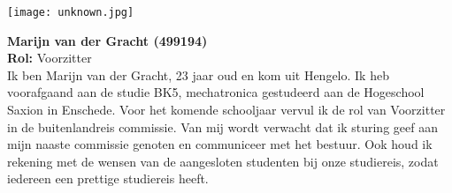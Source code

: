 \vspace{1cm}

\begin{minipage}{0.5\linewidth}
	\texttt{[image: unknown.jpg]}
\end{minipage}
\hfill
\vspace{1cm}
\begin{minipage}{\linewidth}
	\textbf{Marijn van der Gracht (499194)} \\
	\textbf{Rol:} Voorzitter \\
	Ik ben Marijn van der Gracht, 23 jaar oud en kom uit Hengelo. Ik heb voorafgaand aan de studie BK5, mechatronica gestudeerd aan de Hogeschool Saxion in Enschede. Voor het komende schooljaar vervul ik de rol van Voorzitter in de buitenlandreis commissie. Van mij wordt verwacht dat ik sturing geef aan mijn naaste commissie genoten en communiceer met het bestuur. Ook houd ik rekening met de wensen van de aangesloten studenten bij onze studiereis, zodat iedereen een prettige studiereis heeft. 
\end{minipage}